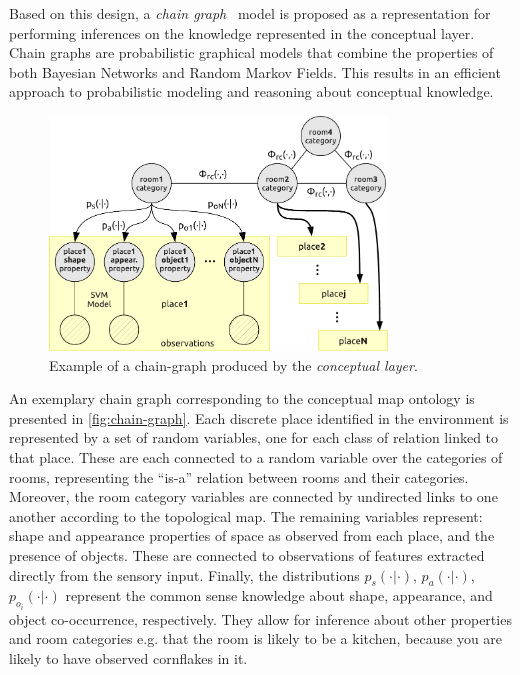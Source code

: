 \documentclass[runningheads,a4paper]{llncs}
\begin{document}
Based on this design, a \emph{chain graph}~\cite{lauritzen2002chain} model is proposed as a 
representation for performing inferences on the knowledge represented in the conceptual 
layer. Chain graphs are probabilistic graphical models that combine the properties of 
both Bayesian Networks and Random Markov Fields. This results in an efficient approach to 
probabilistic modeling and reasoning about conceptual knowledge.

\begin{figure}[h]
\centering
\includegraphics[width=0.80\textwidth]{figures/chaingraph.pdf}
\caption{\label{fig:chain-graph}Example of a chain-graph produced by the \emph{conceptual layer}.}
\end{figure}

An exemplary chain graph corresponding to the conceptual map ontology is presented
in \autoref{fig:chain-graph}. 
Each discrete place identified in the environment is represented by a set of random variables, 
one for each class of relation linked to that place. These are each connected to a random variable
over the categories of rooms, representing the ``is-a'' relation between rooms and their categories. 
Moreover, the room category variables are connected by undirected links to one another according 
to the topological map. The remaining variables represent: shape and appearance properties of space 
as observed from each place, and the presence of objects. 
These are connected to observations of features extracted directly from 
the sensory input. Finally, the 
distributions $p_{s}(\cdot|\cdot)$, $p_a(\cdot|\cdot)$, $p_{o_i}(\cdot|\cdot)$ 
represent the common sense knowledge about shape, appearance, and object co-occurrence, respectively. 
They allow for inference about other properties and room categories e.g. that the room is likely to be a kitchen,
because you are likely to have observed cornflakes in it. 
\end{document}
